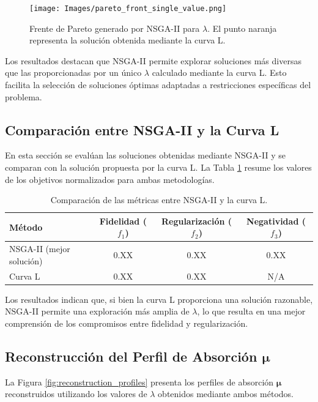 \begin{figure}[h]
    \centering
    \texttt{[image: Images/pareto\_front\_single\_value.png]}
    \caption{Frente de Pareto generado por NSGA-II para \( \lambda \). El punto naranja representa la solución obtenida mediante la curva L.}
    \label{fig:pareto_front}
\end{figure}

Los resultados destacan que NSGA-II permite explorar soluciones más diversas que las proporcionadas por un único \( \lambda \) calculado mediante la curva L. Esto facilita la selección de soluciones óptimas adaptadas a restricciones específicas del problema.

\subsection{Comparación entre NSGA-II y la Curva L} \label{sec:results:comparison}

En esta sección se evalúan las soluciones obtenidas mediante NSGA-II y se comparan con la solución propuesta por la curva L. La Tabla \ref{tab:comparison} resume los valores de los objetivos normalizados para ambas metodologías.

\begin{table}[h]
    \centering
    \begin{tabular}{lccc}
        \toprule
        Método & Fidelidad (\( f_1 \)) & Regularización (\( f_2 \)) & Negatividad (\( f_3 \)) \\
        \midrule
        NSGA-II (mejor solución) & 0.XX & 0.XX & 0.XX \\
        Curva L & 0.XX & 0.XX & N/A \\
        \bottomrule
    \end{tabular}
    \caption{Comparación de las métricas entre NSGA-II y la curva L.}
    \label{tab:comparison}
\end{table}

Los resultados indican que, si bien la curva L proporciona una solución razonable, NSGA-II permite una exploración más amplia de \( \lambda \), lo que resulta en una mejor comprensión de los compromisos entre fidelidad y regularización.

\subsection{Reconstrucción del Perfil de Absorción \( \mathbf{\mu} \)} \label{sec:results:reconstruction}

La Figura \ref{fig:reconstruction_profiles} presenta los perfiles de absorción \( \mathbf{\mu} \) reconstruidos utilizando los valores de \( \lambda \) obtenidos mediante ambos métodos.


